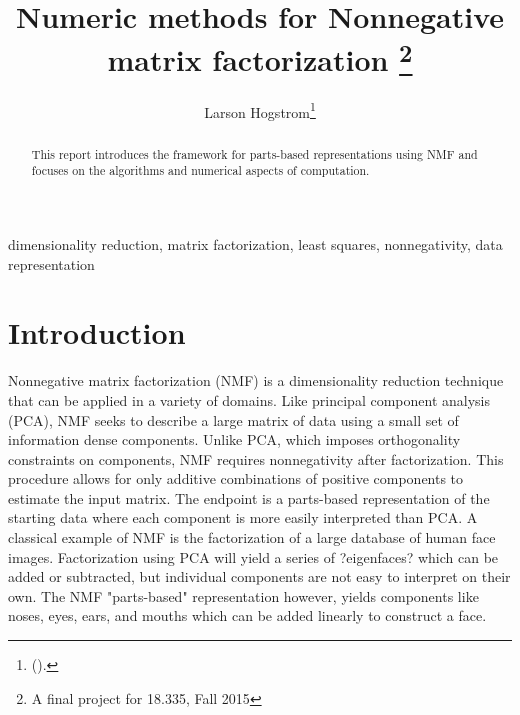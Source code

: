 \documentclass[final,leqno,onefignum,onetabnum]{siamltex1213}
\title{Numeric methods for Nonnegative matrix factorization \thanks{A final project for 18.335, Fall 2015}}
\author{Larson Hogstrom\thanks{
(\email{hogstrom@mit.edu}). }}
\begin{document}
\maketitle
{}%

\begin{abstract}
This report introduces the framework for parts-based representations using NMF and focuses on the algorithms and numerical aspects of computation. 

\end{abstract}

\begin{keywords} dimensionality reduction, matrix factorization, least squares, nonnegativity, data representation \end{keywords}



\pagestyle{myheadings}
\thispagestyle{plain}

\section{Introduction}

Nonnegative matrix factorization (NMF) is a dimensionality reduction technique that can be applied in a variety of domains. Like principal component analysis (PCA), NMF seeks to describe a large matrix of data using a small set of information dense components. Unlike PCA, which imposes orthogonality constraints on components, NMF requires nonnegativity after factorization. This procedure allows for only additive combinations of positive components to estimate the input matrix. The endpoint is a parts-based representation of the starting data where each component is more easily interpreted than PCA. A classical example of NMF is the factorization of a large database of human face images. Factorization using PCA will yield a series of ?eigenfaces? which can be added or subtracted, but individual components are not easy to interpret on their own. The NMF "parts-based" representation however, yields components like noses, eyes, ears, and mouths which can be added linearly to construct a face. 
\end{document}
